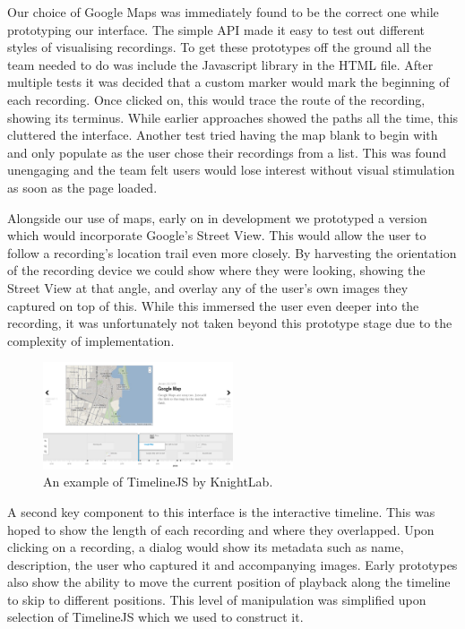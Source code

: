 \documentclass{l3proj}
\begin{document}
Our choice of Google Maps was immediately found to be the correct one while prototyping our interface. The simple API made it easy to test out different styles of visualising recordings. To get these prototypes off the ground all the team needed to do was include the Javascript library in the HTML file. After multiple tests it was decided that a custom marker would mark the beginning of each recording. Once clicked on, this would trace the route of the recording, showing its terminus. While earlier approaches showed the paths all the time, this cluttered the interface. Another test tried having the map blank to begin with and only populate as the user chose their recordings from a list. This was found unengaging and the team felt users would lose interest without visual stimulation as soon as the page loaded.

Alongside our use of maps, early on in development we prototyped a version which would incorporate Google's Street View. This would allow the user to follow a recording's location trail even more closely. By harvesting the orientation of the recording device we could show where they were looking, showing the Street View at that angle, and overlay any of the user's own images they captured on top of this. While this immersed the user even deeper into the recording, it was unfortunately not taken beyond this prototype stage due to the complexity of implementation.

\begin{figure}[ht!]
\centering
\includegraphics[width=0.5\textwidth]{images/timeline-example.png}
\caption{An example of TimelineJS by KnightLab.}
\end{figure}

A second key component to this interface is the interactive timeline. This was hoped to show the length of each recording and where they overlapped. Upon clicking on a recording, a dialog would show its metadata such as name, description, the user who captured it and accompanying images. Early prototypes also show the ability to move the current position of playback along the timeline to skip to different positions. This level of manipulation was simplified upon selection of TimelineJS which we used to construct it.
\end{document}
